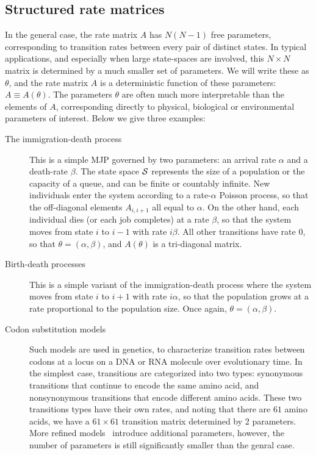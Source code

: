 \subsection{Structured rate matrices}
In the general case, the rate matrix $A$ has $N(N-1)$ free parameters,
corresponding to transition rates between every pair of distinct states. 
In typical applications, and especially when large state-spaces
are involved, this $N \times N$ matrix is determined by a much smaller
set of parameters. We will write these as $\theta$, and the rate 
matrix $A$ is a deterministic function of these parameters: 
$A \equiv A(\theta)$. The parameters $\theta$ are often much more 
interpretable than the elements of $A$, corresponding directly to
physical, biological or environmental parameters of interest. 
Below we give three examples:
\begin{description}
  \item[The immigration-death process] This is a simple MJP governed
    by two parameters: an arrival rate $\alpha$ and a death-rate
    $\beta$. The state space ${\mathcal S}$ represents the size of a 
    population or the capacity of a queue, and can be finite or
    countably infinite. New individuals
    enter the system according to a rate-$\alpha$ Poisson process,
    so that the off-diagonal elements $A_{i,i+1}$ all equal to $\alpha$.
    On the other hand, each individual dies (or each job completes) 
    at a rate $\beta$, so that the system moves from state $i$ to 
    $i-1$ with rate $i\beta$.
    All other transitions have rate $0$, so that $\theta = (\alpha,\beta)$,
    and $A(\theta)$ is a tri-diagonal matrix.
  \item[Birth-death processes] This is a simple variant of the
    immigration-death process where the system moves from state $i$ 
    to $i+1$ with rate $i\alpha$, so that the population grows at a 
    rate proportional to the population size. Once again, 
    $\theta=(\alpha,\beta)$.
  \item[Codon substitution models] Such models are used in genetics,
    to characterize transition rates between codons at a locus on
    a DNA or RNA molecule over evolutionary time. In the simplest case,
    transitions are categorized into two types: synonymous transitions
    that continue to encode the same amino acid, and nonsynonymous 
    transitions that encode different amino acids. 
    These two transitions types have their own rates, and noting that 
    there are $61$ amino acids, we have a $61\times 61$ transition
    matrix determined by 2 parameters. More refined models~\cite[e.g.][]{goldman1994codon} introduce
    additional parameters, however, the number of parameters is still
    significantly smaller than the genral case.
\end{description}
